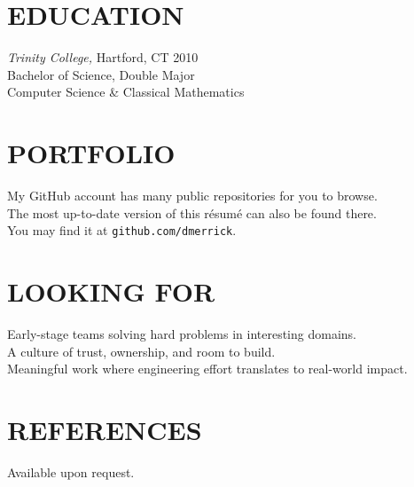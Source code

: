 \documentclass[line,margin]{res}
\begin{document}
\begin{resume}
\section{EDUCATION}
  \textsl{Trinity College,}
  Hartford, CT \hfill 2010 \\
  Bachelor of Science, Double Major \\
  Computer Science \& Classical Mathematics

\section{PORTFOLIO}
  My GitHub account has many public repositories for you to browse. \\
  The most up-to-date version of this r\'{e}sum\'{e} can also be found there. \\
  You may find it at \texttt{github.com/dmerrick}.

\section{LOOKING FOR}
  Early-stage teams solving hard problems in interesting domains. \\
  A culture of trust, ownership, and room to build. \\
  Meaningful work where engineering effort translates to real-world impact.

\section{REFERENCES}
  Available upon request.

\end{resume}
\end{document}
